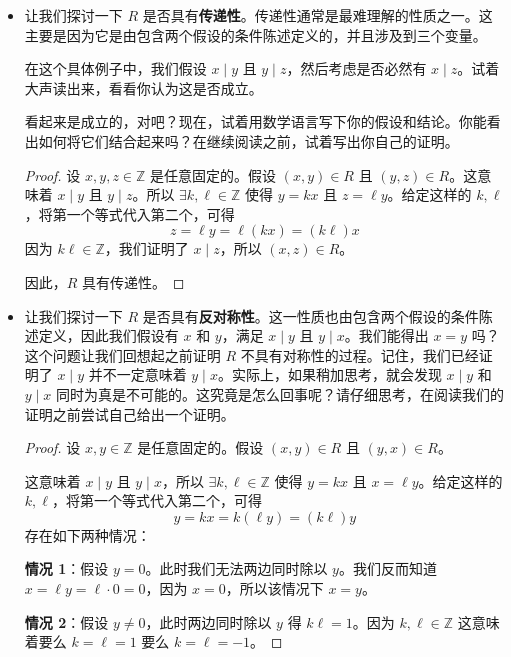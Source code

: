 \begin{example}
\begin{itemize}
\begin{proof}
            然而，使 $2 = \ell \cdot 6$ 成立需要 $\ell = \frac{1}{3}$，而 $\frac{1}{3} \notin \mathbb{Z}$，因此 $(6,2) \notin R$。

            这证明了 $R$ 不具有\emph{对称性}。
        \end{proof}
        \item 让我们探讨一下 $R$ 是否具有\textbf{传递性}。传递性通常是最难理解的性质之一。这主要是因为它是由包含两个假设的条件陈述定义的，并且涉及到三个变量。

        在这个具体例子中，我们假设 $x \mid y$ 且 $y \mid z$，然后考虑是否必然有 $x \mid z$。试着大声读出来，看看你认为这是否成立。
        
        看起来是成立的，对吧？现在，试着用数学语言写下你的假设和结论。你能看出如何将它们结合起来吗？在继续阅读之前，试着写出你自己的证明。
        \begin{proof}
            设 $x, y, z \in \mathbb{Z}$ 是任意固定的。假设 $(x, y) \in R$ 且 $(y, z) \in R$。这意味着 $x \mid y$ 且 $y \mid z$。所以 $\exists k, \ell \in \mathbb{Z}$ 使得 $y = kx$ 且 $z = \ell y$。给定这样的 $k, \ell$，将第一个等式代入第二个，可得
            \[z = \ell y = \ell (kx) = (k \ell)x\]
            因为 $k \ell \in \mathbb{Z}$，我们证明了 $x \mid z$，所以 $(x, z) \in R$。

            因此，$R$ 具有传递性。
        \end{proof}
        \item 让我们探讨一下 $R$ 是否具有\textbf{反对称性}。这一性质也由包含两个假设的条件陈述定义，因此我们假设有 $x$ 和 $y$，满足 $x \mid y$ 且 $y \mid x$。我们能得出 $x = y$ 吗？这个问题让我们回想起之前证明 $R$ 不具有对称性的过程。记住，我们已经证明了 $x \mid y$ 并不一定意味着 $y \mid x$。实际上，如果稍加思考，就会发现 $x \mid y$ 和 $y \mid x$ 同时为真是不可能的。这究竟是怎么回事呢？请仔细思考，在阅读我们的证明之前尝试自己给出一个证明。
        \begin{proof}
            设 $x, y \in \mathbb{Z}$ 是任意固定的。假设 $(x, y) \in R$ 且 $(y,x) \in R$。

            这意味着 $x \mid y$ 且 $y \mid x$，所以 $\exists k, \ell \in \mathbb{Z}$ 使得 $y = kx$ 且 $x = \ell y$。给定这样的 $k, \ell$，将第一个等式代入第二个，可得
            \[y = kx = k(\ell y) = (k \ell)y\]
            存在如下两种情况：

            \textbf{情况 1}：假设 $y=0$。此时我们无法两边同时除以 $y$。我们反而知道 $x = \ell y = \ell \cdot 0 = 0$，因为 $x=0$，所以该情况下 $x=y$。

            \textbf{情况 2}：假设 $y \ne 0$，此时两边同时除以 $y$ 得 $k \ell = 1$。因为 $k, \ell \in \mathbb{Z}$ 这意味着要么 $k = \ell = 1$ 要么 $k = \ell = -1$。


\end{proof}
\end{itemize}
\end{example}
